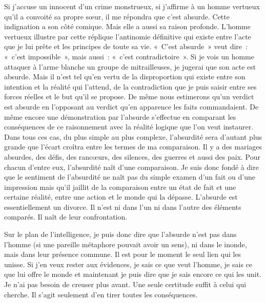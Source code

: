 \documentclass{book}
\begin{document}
Si j'accuse un innocent d'un crime monstrueux, si j'affirme à un homme vertueux qu'il a convoité sa propre sœur, il me répondra que c'est absurde. Cette indignation a son côté comique. Mais elle a aussi sa raison profonde. L'homme vertueux illustre par cette réplique l'antinomie définitive qui existe entre l'acte que je lui prête et les principes de toute sa vie. « C'est absurde » veut dire : « c'est impossible », mais aussi : « c'est contradictoire ». Si je vois un homme attaquer à l'arme blanche un groupe de mitrailleuses, je jugerai que son acte est absurde. Mais il n'est tel qu'en vertu de la disproportion qui existe entre son intention et la réalité qui l'attend, de la contradiction que je puis saisir entre ses forces réelles et le but qu'il se propose. De même nous estimerons qu'un verdict est absurde en l'opposant au verdict qu'en apparence les faits commandaient. De même encore une démonstration par l'absurde s'effectue en comparant les conséquences de ce raisonnement avec la réalité logique que l'on veut instaurer. Dans tous ces cas, du plus simple au plus complexe, l'absurdité sera d'autant plus grande que l'écart croîtra entre les termes de ma comparaison. Il y a des mariages absurdes, des défis, des rancœurs, des silences, des guerres et aussi des paix. Pour chacun d'entre eux, l'absurdité naît d'une comparaison. Je suis donc fondé à dire que le sentiment de l'absurdité ne naît pas du simple examen d'un fait ou d'une impression mais qu'il jaillit de la comparaison entre un état de fait et une certaine réalité, entre une action et le monde qui la dépasse. L'absurde est essentiellement un divorce. Il n'est ni dans l'un ni dans l'autre des éléments comparés. Il naît de leur confrontation.

Sur le plan de l'intelligence, je puis donc dire que l'absurde n'est pas dans l'homme (si une pareille métaphore pouvait avoir un sens), ni dans le inonde, mais dans leur présence commune. Il est pour le moment le seul lien qui les unisse. Si j'en veux rester aux évidences, je sais ce que veut l'homme, je sais ce que lui offre le monde et maintenant je puis dire que je sais encore ce qui les unit. Je n'ai pas besoin de creuser plus avant. Une seule certitude suffit à celui qui cherche. Il s'agit seulement d'en tirer toutes les conséquences.
\end{document}

